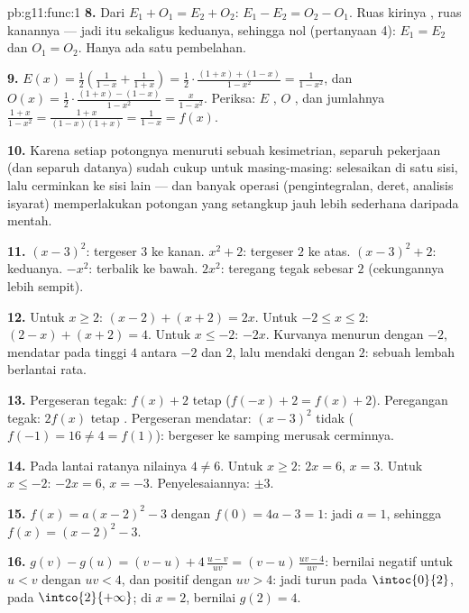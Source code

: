 \begin{solution}{pb:g11:func:1}
\textbf{8.} Dari $E_1 + O_1 = E_2 + O_2$:
$E_1 - E_2 = O_2 - O_1$. Ruas kirinya , ruas kanannya
 --- jadi  itu sekaligus keduanya, sehingga nol (pertanyaan 4):
$E_1 = E_2$ dan $O_1 = O_2$. Hanya ada satu pembelahan.

\textbf{9.} $E(x) = \frac12\left(\frac{1}{1 - x} + \frac{1}{1 +
x}\right) = \frac12 \cdot \frac{(1 + x) + (1 - x)}{1 - x^2}
= \frac{1}{1 - x^2}$, dan
$O(x) = \frac12 \cdot \frac{(1 + x) - (1 - x)}{1 - x^2}
= \frac{x}{1 - x^2}$. Periksa: $E$ , $O$ , dan
jumlahnya $\frac{1 + x}{1 - x^2} =
\frac{1 + x}{(1 - x)(1 + x)} = \frac{1}{1 - x} = f(x)$.

\textbf{10.} Karena setiap potongnya menuruti sebuah kesimetrian, separuh
pekerjaan (dan separuh datanya) sudah cukup untuk masing-masing: selesaikan
di satu sisi, lalu cerminkan ke sisi lain --- dan banyak operasi
(pengintegralan, deret, analisis isyarat) memperlakukan potongan yang
setangkup jauh lebih sederhana daripada  mentah.

\textbf{11.} $(x-3)^2$: tergeser $3$ ke kanan. $x^2 + 2$: tergeser
$2$ ke atas. $(x-3)^2 + 2$: keduanya. $-x^2$: terbalik ke bawah.
$2x^2$: teregang tegak sebesar $2$ (cekungannya lebih sempit).

\textbf{12.} Untuk $x \geq 2$: $(x - 2) + (x + 2) = 2x$. Untuk
$-2 \leq x \leq 2$: $(2 - x) + (x + 2) = 4$. Untuk $x \leq -2$:
$-2x$. Kurvanya menurun dengan  $-2$, mendatar pada tinggi
$4$ antara $-2$ dan $2$, lalu mendaki dengan  $2$: sebuah lembah
berlantai rata.

\textbf{13.} Pergeseran tegak: $f(x) + 2$ tetap 
($f(-x) + 2 = f(x) + 2$). Peregangan tegak: $2f(x)$ tetap
. Pergeseran mendatar: $(x - 3)^2$ tidak 
($f(-1) = 16 \neq 4 = f(1)$): bergeser ke samping merusak
cerminnya.

\textbf{14.} Pada lantai ratanya nilainya $4 \neq 6$. Untuk
$x \geq 2$: $2x = 6$, $x = 3$. Untuk $x \leq -2$: $-2x = 6$,
$x = -3$. Penyelesaiannya: $\pm 3$.

\textbf{15.} $f(x) = a(x - 2)^2 - 3$ dengan $f(0) = 4a - 3 = 1$:
jadi $a = 1$, sehingga $f(x) = (x - 2)^2 - 3$.

\textbf{16.} $g(v) - g(u) = (v - u) + 4\,\frac{u - v}{uv}
= (v - u)\,\frac{uv - 4}{uv}$: bernilai negatif untuk $u < v$ dengan
$uv < 4$, dan positif dengan $uv > 4$: jadi turun pada
$\intoc{0}{2}$,  pada $\intco{2}{+\infty}$;  di
$x = 2$, bernilai $g(2) = 4$.


\end{solution}
